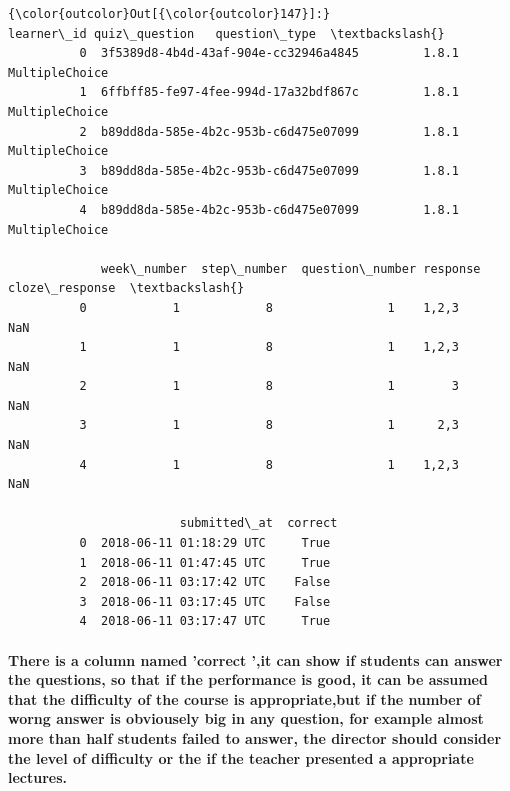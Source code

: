 \documentclass[11pt]{article}
\begin{document}
\begin{Verbatim}[commandchars=\\\{\}]
{\color{outcolor}Out[{\color{outcolor}147}]:}                              learner\_id quiz\_question   question\_type  \textbackslash{}
          0  3f5389d8-4b4d-43af-904e-cc32946a4845         1.8.1  MultipleChoice   
          1  6ffbff85-fe97-4fee-994d-17a32bdf867c         1.8.1  MultipleChoice   
          2  b89dd8da-585e-4b2c-953b-c6d475e07099         1.8.1  MultipleChoice   
          3  b89dd8da-585e-4b2c-953b-c6d475e07099         1.8.1  MultipleChoice   
          4  b89dd8da-585e-4b2c-953b-c6d475e07099         1.8.1  MultipleChoice   
          
             week\_number  step\_number  question\_number response  cloze\_response  \textbackslash{}
          0            1            8                1    1,2,3             NaN   
          1            1            8                1    1,2,3             NaN   
          2            1            8                1        3             NaN   
          3            1            8                1      2,3             NaN   
          4            1            8                1    1,2,3             NaN   
          
                        submitted\_at  correct  
          0  2018-06-11 01:18:29 UTC     True  
          1  2018-06-11 01:47:45 UTC     True  
          2  2018-06-11 03:17:42 UTC    False  
          3  2018-06-11 03:17:45 UTC    False  
          4  2018-06-11 03:17:47 UTC     True  
\end{Verbatim}
            
    \paragraph{There is a column named 'correct ',it can show if students
can answer the questions, so that if the performance is good, it can be
assumed that the difficulty of the course is appropriate,but if the
number of worng answer is obviousely big in any question, for example
almost more than half students failed to answer, the director should
consider the level of difficulty or the if the teacher presented a
appropriate
lectures.}\label{there-is-a-column-named-correct-it-can-show-if-students-can-answer-the-questions-so-that-if-the-performance-is-good-it-can-be-assumed-that-the-difficulty-of-the-course-is-appropriatebut-if-the-number-of-worng-answer-is-obviousely-big-in-any-question-for-example-almost-more-than-half-students-failed-to-answer-the-director-should-consider-the-level-of-difficulty-or-the-if-the-teacher-presented-a-appropriate-lectures.}
\end{document}
